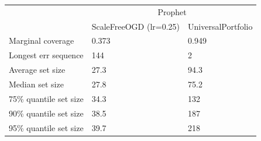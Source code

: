 \begin{tabular}{lll}
\toprule
& \multicolumn{2}{c}{Prophet} \\
& ScaleFreeOGD (lr=0.25) & UniversalPortfolio \\
\midrule
Marginal coverage & 0.373 & 0.949 \\
Longest err sequence & 144 & 2 \\
Average set size & 27.3 & 94.3 \\
Median set size & 27.8 & 75.2 \\
75\% quantile set size & 34.3 & 132 \\
90\% quantile set size & 38.5 & 187 \\
95\% quantile set size & 39.7 & 218 \\
\bottomrule
\end{tabular}
